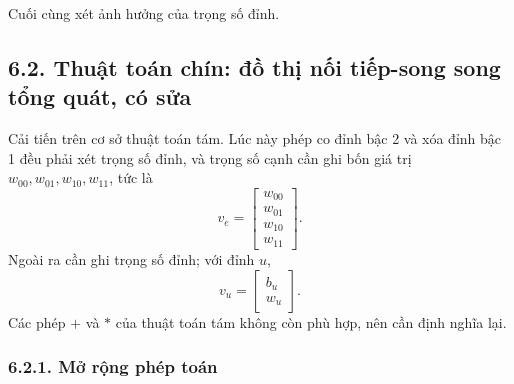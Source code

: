 \documentclass[11pt]{article}
\begin{document}
Cuối cùng xét ảnh hưởng của trọng số đỉnh.

\subsection*{6.2. Thuật toán chín: đồ thị nối tiếp-song song tổng quát, có sửa}

Cải tiến trên cơ sở thuật toán tám. Lúc này phép co đỉnh bậc 2 và xóa đỉnh
bậc 1 đều phải xét trọng số đỉnh, và trọng số cạnh cần ghi bốn giá trị
\(w_{00},w_{01},w_{10},w_{11}\), tức là
\[
  v_e=\begin{bmatrix}w_{00}\\w_{01}\\w_{10}\\w_{11}\end{bmatrix}.
\]
Ngoài ra cần ghi trọng số đỉnh; với đỉnh \(u\),
\[
  v_u=\begin{bmatrix}b_u\\w_u\end{bmatrix}.
\]
Các phép \(+\) và \(\ast\) của thuật toán tám không còn phù hợp, nên cần định
nghĩa lại.

\subsubsection*{6.2.1. Mở rộng phép toán}
\end{document}

